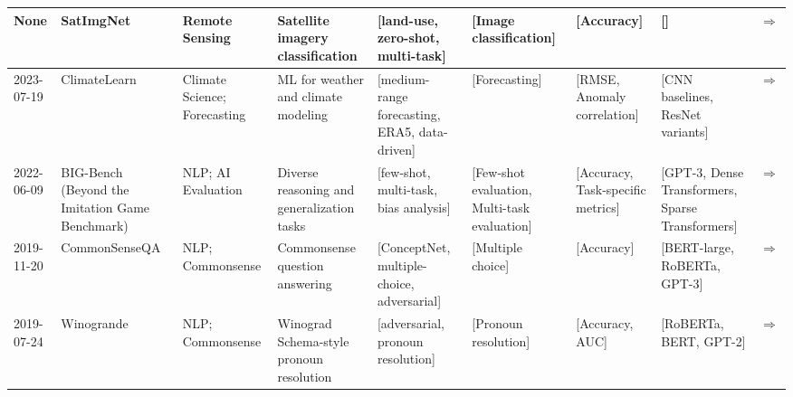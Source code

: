 \documentclass{article}
\begin{document}
\begin{landscape}
{\begin{longtable}{|p{1.5cm}|p{2.5cm}|p{2cm}|p{2cm}|p{2.5cm}|p{3cm}|p{2cm}|p{2cm}|p{1cm}|}
None & SatImgNet & Remote Sensing & Satellite imagery classification & [land-use, zero-shot, multi-task] & [Image classification] & [Accuracy] & [] & \cite{roberts2023satinmultitaskmetadatasetclassifying} \href{https://arxiv.org/abs/2304.11619}{$\Rightarrow$ } \\ \hline
2023-07-19 & ClimateLearn & Climate Science; Forecasting & ML for weather and climate modeling & [medium-range forecasting, ERA5, data-driven] & [Forecasting] & [RMSE, Anomaly correlation] & [CNN baselines, ResNet variants] & \cite{nguyen2023climatelearnbenchmarkingmachinelearning} \href{https://arxiv.org/abs/2307.01909}{$\Rightarrow$ } \\ \hline
2022-06-09 & BIG-Bench (Beyond the Imitation Game Benchmark) & NLP; AI Evaluation & Diverse reasoning and generalization tasks & [few-shot, multi-task, bias analysis] & [Few-shot evaluation, Multi-task evaluation] & [Accuracy, Task-specific metrics] & [GPT-3, Dense Transformers, Sparse Transformers] & \cite{srivastava2023imitationgamequantifyingextrapolating} \href{https://arxiv.org/abs/2206.04615}{$\Rightarrow$ } \\ \hline
2019-11-20 & CommonSenseQA & NLP; Commonsense & Commonsense question answering & [ConceptNet, multiple-choice, adversarial] & [Multiple choice] & [Accuracy] & [BERT-large, RoBERTa, GPT-3] & \cite{talmor2019commonsenseqaquestionansweringchallenge} \href{https://arxiv.org/abs/1811.00937}{$\Rightarrow$ } \\ \hline
2019-07-24 & Winogrande & NLP; Commonsense & Winograd Schema-style pronoun resolution & [adversarial, pronoun resolution] & [Pronoun resolution] & [Accuracy, AUC] & [RoBERTa, BERT, GPT-2] & \cite{sakaguchi2019winograndeadversarialwinogradschema} \href{https://arxiv.org/abs/1907.10641}{$\Rightarrow$ } \\ \hline
\end{longtable}
}
\end{landscape}
\printbibliography
\end{document}
